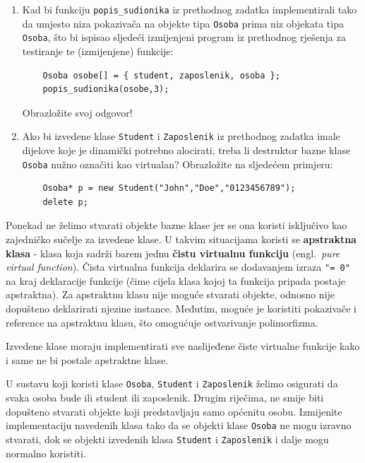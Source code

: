 \begin{razmisljanje}
    \begin{enumerate}
        \item 
        Kad bi funkciju \texttt{popis\_sudionika} iz prethodnog zadatka implementirali 
        tako da umjesto niza pokazivača na objekte tipa \texttt{Osoba}
        prima niz objekata tipa \texttt{Osoba},
        što bi ispisao sljedeći izmijenjeni program iz prethodnog rješenja za testiranje te (izmijenjene) funkcije:
        \begin{verbatim}
    Osoba osobe[] = { student, zaposlenik, osoba };
    popis_sudionika(osobe,3);
\end{verbatim}
    Obrazložite svoj odgovor!

    \item 
    Ako bi izvedene klase \texttt{Student} i \texttt{Zaposlenik} iz prethodnog zadatka
    imale dijelove koje je dinamički potrebno alocirati,
    treba li destruktor bazne klase \texttt{Osoba} nužno označiti kao virtualan?
    Obrazložite na sljedećem primjeru:

    \begin{verbatim}
    Osoba* p = new Student("John","Doe","0123456789");
    delete p;
    \end{verbatim}
    \end{enumerate}
\end{razmisljanje}


Ponekad ne želimo stvarati objekte bazne klase jer se ona koristi isključivo kao zajedničko sučelje za izvedene klase. 
U takvim situacijama koristi se \textbf{apstraktna klasa}
 - klasa koja sadrži barem jednu \textbf{čistu virtualnu funkciju} 
(engl.\ \textit{pure virtual function}). 
 Čista virtualna funkcija deklarira se dodavanjem izraza \texttt{"= 0"} na kraj deklaracije funkcije
(čime cijela klasa kojoj ta funkcija pripada postaje apstraktna).
Za apstraktnu klasu nije moguće stvarati objekte, odnosno nije dopušteno deklarirati njezine instance. 
Međutim, moguće je koristiti pokazivače i reference na apstraktnu klasu, što omogućuje ostvarivanje polimorfizma.
\medskip
    
Izvedene klase moraju implementirati sve naslijeđene čiste virtualne funkcije 
kako i same ne bi postale apstraktne klase.


\begin{zadatak}
    U sustavu koji koristi klase \texttt{Osoba}, \texttt{Student} i
    \texttt{Zaposlenik} želimo osigurati da svaka osoba bude ili student
    ili zaposlenik. Drugim riječima,
    ne smije biti dopušteno stvarati objekte koji predstavljaju
    samo općenitu osobu.
    Izmijenite implementaciju navedenih klasa tako da se objekti klase
    \texttt{Osoba} ne mogu izravno stvarati, dok se objekti izvedenih
    klasa \texttt{Student} i \texttt{Zaposlenik} i dalje mogu normalno
    koristiti.
\end{zadatak}


